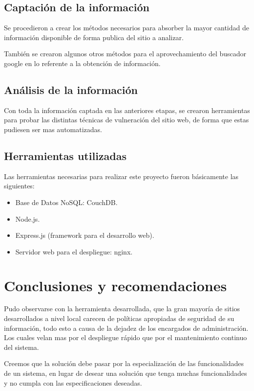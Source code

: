 \documentclass[letter,twoside,11pt]{article}
\begin{document}
\subsection{Captación de la información}
Se procedieron a crear los métodos necesarios para absorber la mayor cantidad de
información disponible de forma publica del sitio a analizar.

También se crearon algunos otros métodos para el aprovechamiento del buscador
google en lo referente a la obtención de información.

\subsection{Análisis de la información}
Con toda la información captada en las anteriores etapas, se crearon
herramientas para probar las distintas técnicas de vulneración del sitio web, de
forma que estas pudiesen ser mas automatizadas.

\subsection{Herramientas utilizadas}
Las herramientas necesarias para realizar este proyecto fueron básicamente las
siguientes:

\begin{itemize}
    \item Base de Datos NoSQL: CouchDB.
    \item Node.js.
    \item Express.js (framework para el desarrollo web).
    \item Servidor web para el despliegue: nginx.
\end{itemize}

\section{Conclusiones y recomendaciones}
Pudo observarse con la herramienta desarrollada, que la gran mayoría de sitios
desarrollados a nivel local carecen de políticas apropiadas de seguridad de su
información, todo esto a causa de la dejadez de los encargados de
administración. Los cuales velan mas por el despliegue rápido que por el
mantenimiento continuo del sistema.

Creemos que la solución debe pasar por la especialización de las funcionalidades
de un sistema, en lugar de desear una solución que tenga muchas funcionalidades
y no cumpla con las especificaciones deseadas.
\end{document}
